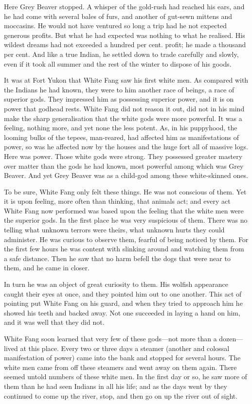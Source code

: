 \documentclass[10pt]{book}
\begin{document}
Here Grey Beaver stopped. A whisper of the gold-rush had reached his
ears, and he had come with several bales of furs, and another of
gut-sewn mittens and moccasins. He would not have ventured so long a
trip had he not expected generous profits. But what he had expected was
nothing to what he realised. His wildest dreams had not exceeded a
hundred per cent. profit; he made a thousand per cent. And like a true
Indian, he settled down to trade carefully and slowly, even if it took
all summer and the rest of the winter to dispose of his goods.

It was at Fort Yukon that White Fang saw his first white men. As
compared with the Indians he had known, they were to him another race
of beings, a race of superior gods. They impressed him as possessing
superior power, and it is on power that godhead rests. White Fang did
not reason it out, did not in his mind make the sharp generalisation
that the white gods were more powerful. It was a feeling, nothing more,
and yet none the less potent. As, in his puppyhood, the looming bulks
of the tepees, man-reared, had affected him as manifestations of power,
so was he affected now by the houses and the huge fort all of massive
logs. Here was power. Those white gods were strong. They possessed
greater mastery over matter than the gods he had known, most powerful
among which was Grey Beaver. And yet Grey Beaver was as a child-god
among these white-skinned ones.

To be sure, White Fang only felt these things. He was not conscious of
them. Yet it is upon feeling, more often than thinking, that animals
act; and every act White Fang now performed was based upon the feeling
that the white men were the superior gods. In the first place he was
very suspicious of them. There was no telling what unknown terrors were
theirs, what unknown hurts they could administer. He was curious to
observe them, fearful of being noticed by them. For the first few hours
he was content with slinking around and watching them from a safe
distance. Then he saw that no harm befell the dogs that were near to
them, and he came in closer.

In turn he was an object of great curiosity to them. His wolfish
appearance caught their eyes at once, and they pointed him out to one
another. This act of pointing put White Fang on his guard, and when
they tried to approach him he showed his teeth and backed away. Not one
succeeded in laying a hand on him, and it was well that they did not.

White Fang soon learned that very few of these gods—not more than a
dozen—lived at this place. Every two or three days a steamer (another
and colossal manifestation of power) came into the bank and stopped for
several hours. The white men came from off these steamers and went away
on them again. There seemed untold numbers of these white men. In the
first day or so, he saw more of them than he had seen Indians in all
his life; and as the days went by they continued to come up the river,
stop, and then go on up the river out of sight.
\end{document}
